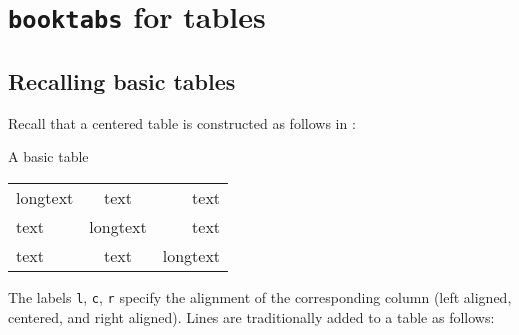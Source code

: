 \section{\texttt{booktabs} for tables}



\subsection{Recalling basic tables}

Recall that a centered table is constructed as follows in :
\begin{showlatex}{A basic table}
\begin{tabular}{lcr}
  longtext & text     & text      \\
  text     & longtext & text      \\
  text     & text     & longtext
\end{tabular}
\end{showlatex}
The labels \texttt{l}, \texttt{c}, \texttt{r} specify the alignment of the corresponding column (left aligned, centered, and right aligned).
Lines are traditionally added to a table as follows:
